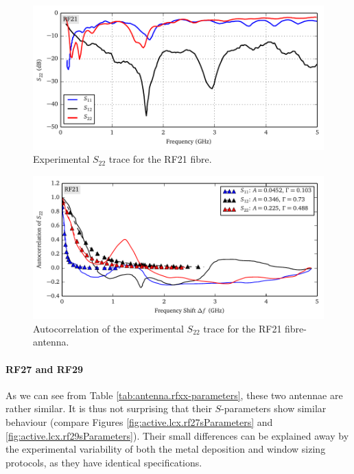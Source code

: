 \begin{figure}
 \centering
 \includegraphics{figs/active/RF21-sParameters.pdf}
 \caption[Experimental $S_{22}$ trace for the RF21 fibre]
 		{Experimental $S_{22}$ trace for the RF21 fibre.}
 \label{fig:active.lcx.rf21sParameters}
\end{figure}

\begin{figure}
 \centering
 \includegraphics{figs/active/RF21-autoCorrelation.pdf}
 \caption[Autocorrelation of the experimental $S_{22}$ trace for the RF21 fibre-antenna]
 		{Autocorrelation of the experimental $S_{22}$ trace for the RF21 fibre-antenna.}
 \label{fig:active.lcx.rf21autocorrelation}
\end{figure}

\paragraph{RF27 and RF29}
As we can see from Table \ref{tab:antenna.rfxx-parameters}, these two antennae
are rather similar. It is thus not surprising that their $S$-parameters
show similar behaviour (compare Figures \ref{fig:active.lcx.rf27sParameters} and
\ref{fig:active.lcx.rf29sParameters}). Their small differences can be explained
away by the experimental variability of both the metal deposition and window
sizing protocols, as they have identical specifications.

